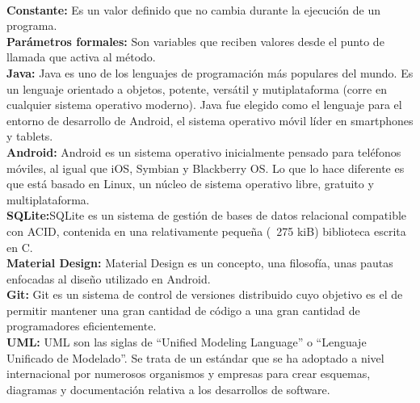 \\
\textbf{Constante:} Es un valor definido que no cambia durante la ejecución de un programa.
\\
\textbf{Parámetros formales:} Son variables que reciben valores desde el punto de llamada que activa al método.
\\
\textbf{Java:} Java es uno de los lenguajes de programación más populares del mundo. Es un lenguaje orientado a objetos, potente, versátil y mutiplataforma (corre en cualquier sistema operativo moderno). Java fue elegido como el lenguaje para el entorno de desarrollo de Android, el sistema operativo móvil líder en smartphones y tablets.
\\
\textbf{Android:} Android es un sistema operativo inicialmente pensado para teléfonos móviles, al igual que iOS, Symbian y Blackberry OS. Lo que lo hace diferente es que está basado en Linux, un núcleo de sistema operativo libre, gratuito y multiplataforma.
\\
\textbf{SQLite:}SQLite es un sistema de gestión de bases de datos relacional compatible con ACID, contenida en una relativamente pequeña (~275 kiB) biblioteca escrita en C.
\\
\textbf{Material Design:} Material Design es un concepto, una filosofía, unas pautas enfocadas al diseño utilizado en Android.
\\
\textbf{Git:} Git es un sistema de control de versiones distribuido cuyo objetivo es el de permitir mantener una gran cantidad de código a una gran cantidad de programadores eficientemente.
\\
\textbf{UML:} UML son las siglas de “Unified Modeling Language” o “Lenguaje Unificado de Modelado”. Se trata de un estándar que se ha adoptado a nivel internacional por numerosos organismos y empresas para crear esquemas, diagramas y documentación relativa a los desarrollos de software.

